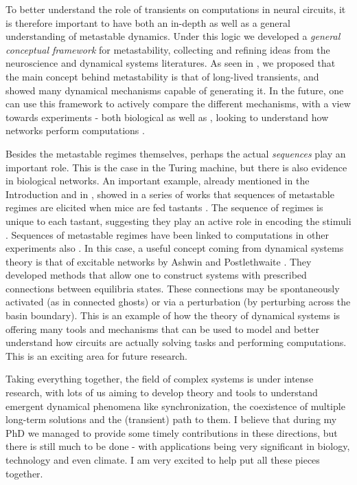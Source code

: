 To better understand the role of transients on computations in neural circuits, it is therefore important to have both an in-depth as well as a general understanding of metastable dynamics. Under this logic we developed a \textit{general conceptual framework} for metastability, collecting and refining ideas from the neuroscience and dynamical systems literatures. As seen in , we proposed that the main concept behind metastability is that of long-lived transients, and showed many dynamical mechanisms capable of generating it. In the future, one can use this framework to actively compare the different mechanisms, with a view towards experiments - both biological as well as , looking to understand how networks perform computations \cite{koch2024biological}.

Besides the metastable regimes themselves, perhaps the actual \textit{sequences} play an important role. This is the case in the Turing machine, but there is also evidence in biological networks. An important example, already mentioned in the Introduction and in , showed in a series of works that sequences of metastable regimes are elicited when mice are fed tastants \cite{jones2007natural}. The sequence of regimes is unique to each tastant, suggesting they play an active role in encoding the stimuli \cite{lacamera2019cortical}. Sequences of metastable regimes have been linked to computations in other experiments also \cite{mazor2005transient, lacamera2019cortical, driscoll2024flexible}. In this case, a useful concept coming from dynamical systems theory is that of excitable networks by Ashwin and Postlethwaite \cite{ashwin2021excitable, ashwin2024network}. They developed methods that allow one to construct systems with prescribed connections between equilibria states. These connections may be spontaneously activated (as in connected ghosts) or via a perturbation (by perturbing across the basin boundary). This is an example of how the theory of dynamical systems is offering many tools and mechanisms that can be used to model and better understand how circuits are actually solving tasks and performing computations. This is an exciting area for future research.

Taking everything together, the field of complex systems is under intense research, with lots of us aiming to develop theory and tools to understand emergent dynamical phenomena like synchronization, the coexistence of multiple long-term solutions and the (transient) path to them. I believe that during my PhD we managed to provide some timely contributions in these directions, but there is still much to be done - with applications being very significant in biology, technology and even climate. I am very excited to help put all these pieces together.



